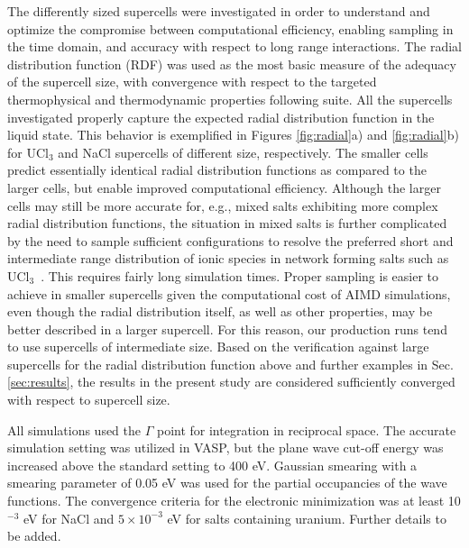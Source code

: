 \documentclass[preprint,3p,10pt,twocolumn,number,sort&compress]{elsarticle}
\begin{document}
The differently sized supercells were investigated in order to understand and optimize the compromise between computational efficiency, enabling sampling in the time domain, and accuracy with respect to long range interactions. The radial distribution function (RDF) was used as the most basic measure of the adequacy of the supercell size, with convergence with respect to the targeted thermophysical and thermodynamic properties following suite. 
All the supercells investigated properly capture the expected radial distribution function in the liquid state. %
This behavior is exemplified in Figures \ref{fig:radial}a) and \ref{fig:radial}b) for UCl$_3$ and NaCl supercells of different size, respectively. %
The smaller cells predict essentially identical radial distribution functions as compared to the larger cells, but enable improved computational efficiency. %
Although the larger cells may still be more accurate for, e.g., mixed salts exhibiting more complex radial distribution functions, the situation in mixed salts is further complicated by the need to sample sufficient configurations to resolve the preferred short and intermediate range distribution of ionic species in network forming salts such as UCl$_3$~\cite{Li}. This requires fairly long simulation times. %
Proper sampling is easier to achieve in smaller supercells given the computational cost of AIMD simulations, even though the radial distribution itself, as well as other properties, may be better described in a larger supercell. For this reason, our production runs tend to use supercells of intermediate size.  Based on the verification against large supercells for the radial distribution function above and further examples in Sec. \ref{sec:results}, the results in the present study are considered sufficiently converged with respect to supercell size.

All simulations used the $\Gamma$ point for integration in reciprocal space. The accurate simulation setting was utilized in VASP, but the plane wave cut-off energy was increased above the standard setting to 400 eV. Gaussian smearing with a smearing parameter of 0.05 eV was used for the partial occupancies of the wave functions. The convergence criteria for the electronic minimization was at least 10$^{-3}$ eV for NaCl and $5\times10^{-3}$ eV for salts containing uranium. {\color{red} Further details to be added}.
\end{document}
